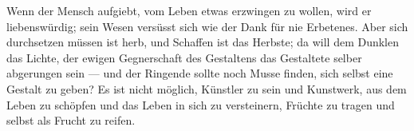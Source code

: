 Wenn der Mensch aufgiebt, vom Leben etwas erzwingen zu wollen, wird er liebenswürdig; sein Wesen versüsst sich wie der Dank für nie Erbetenes. Aber sich durchsetzen müssen ist herb, und Schaffen ist das Herbste; da will dem Dunklen das Lichte, der ewigen Gegnerschaft des Gestaltens das Gestaltete selber abgerungen sein — und der Ringende sollte noch Musse finden, sich selbst eine Gestalt zu geben? Es ist nicht möglich, Künstler zu sein und Kunstwerk, aus dem Leben zu schöpfen und das Leben in sich zu versteinern, Früchte zu tragen und selbst als Frucht zu reifen.
\par

